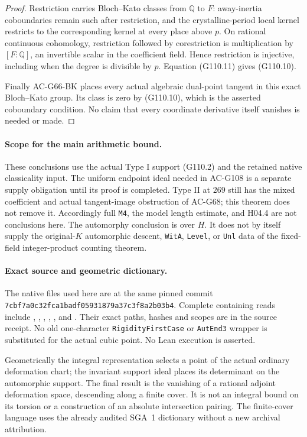\begin{proof}
Restriction carries Bloch--Kato classes from \(\mathbb Q\)
to \(F\): away-inertia coboundaries remain such after
restriction, and the crystalline-period local kernel
restricts to the corresponding kernel at every place
above \(p\). On rational continuous cohomology,
restriction followed by corestriction is multiplication
by \([F:\mathbb Q]\), an invertible scalar in the
coefficient field. Hence restriction is injective,
including when the degree is divisible by \(p\).
Equation (G110.11) gives (G110.10).

Finally AC-G66-BK places every actual algebraic dual-point
tangent in this exact Bloch--Kato group. Its class is
zero by (G110.10), which is the asserted coboundary
condition. No claim that every coordinate derivative
itself vanishes is needed or made.
\end{proof}

\paragraph{Scope for the main arithmetic bound.}
These conclusions use the actual Type I support (G110.2)
and the retained native classicality input. The uniform
endpoint ideal needed in AC-G108 is a separate supply
obligation until its proof is completed. Type II at
\(269\) still has the mixed coefficient and actual
tangent-image obstruction of AC-G68; this theorem does
not remove it. Accordingly full \texttt{M4}, the model
length estimate, and H04.4 are not conclusions here.
The automorphy conclusion is over \(H\). It does not
by itself supply the original-\(K\) automorphic
descent, \texttt{WitA}, \texttt{Level}, or \texttt{Unl}
data of the fixed-field integer-product counting theorem.

\paragraph{Exact source and geometric dictionary.}
The native files used here are at the same pinned commit
\texttt{7cbf7a0c32fca1badf05931879a37c3f8a2b03b4}.
Complete containing reads include ,
, ,
,
,
and .
Their exact paths, hashes and scopes are in the source
receipt. No old one-character \texttt{RigidityFirstCase}
or \texttt{AutEnd3} wrapper is substituted for the
actual cubic point. No Lean execution is asserted.

Geometrically the integral representation selects a point
of the actual ordinary deformation chart; the invariant
support ideal places its determinant on the automorphic
support. The final result is the vanishing of a rational
adjoint deformation space, descending along a finite
cover. It is not an integral bound on its torsion
or a construction of an absolute intersection pairing.
The finite-cover language uses the already audited
SGA~1 dictionary without a new archival attribution.

